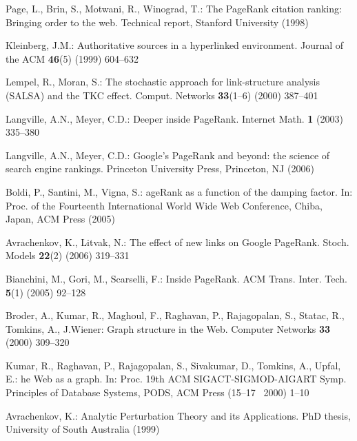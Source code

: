 \documentclass{article}
\begin{document}
\begin{thebibliography}{10}

Page, L., Brin, S., Motwani, R., Winograd, T.:
\newblock The {P}age{R}ank citation ranking: Bringing order to the web.
\newblock Technical report, Stanford University (1998)

Kleinberg, J.M.:
\newblock Authoritative sources in a hyperlinked environment.
\newblock Journal of the ACM \textbf{46}(5) (1999)  604--632

Lempel, R., Moran, S.:
\newblock The stochastic approach for link-structure analysis {({SALSA})} and
  the {TKC} effect.
\newblock Comput. Networks \textbf{33}(1--6) (2000)  387--401

Langville, A.N., Meyer, C.D.:
\newblock Deeper inside {P}age{R}ank.
\newblock Internet Math. \textbf{1} (2003)  335--380

Langville, A.N., Meyer, C.D.:
\newblock Google's {P}age{R}ank and beyond: the science of search engine
  rankings.
\newblock Princeton University Press, Princeton, NJ (2006)

Boldi, P., Santini, M., Vigna, S.:
age{R}ank as a function of the damping factor.
\newblock In: Proc. of the Fourteenth International World Wide Web Conference,
  Chiba, Japan, ACM Press (2005)

Avrachenkov, K., Litvak, N.:
\newblock The effect of new links on {G}oogle {P}age{R}ank.
\newblock Stoch. Models \textbf{22}(2) (2006)  319--331

Bianchini, M., Gori, M., Scarselli, F.:
\newblock Inside {P}age{R}ank.
\newblock ACM Trans. Inter. Tech. \textbf{5}(1) (2005)  92--128

Broder, A., Kumar, R., Maghoul, F., Raghavan, P., Rajagopalan, S., Statac, R.,
  Tomkins, A., J.Wiener:
\newblock Graph structure in the {W}eb.
\newblock Computer Networks \textbf{33} (2000)  309--320

Kumar, R., Raghavan, P., Rajagopalan, S., Sivakumar, D., Tomkins, A., Upfal,
  E.:
he {W}eb as a graph.
\newblock In: Proc. 19th {ACM} {SIGACT}-{SIGMOD}-{AIGART} Symp. Principles of
  Database Systems, {PODS}, ACM Press (15--17~ 2000)  1--10

Avrachenkov, K.:
\newblock Analytic Perturbation Theory and its Applications.
\newblock PhD thesis, University of South Australia (1999)


\end{thebibliography}
\end{document}
